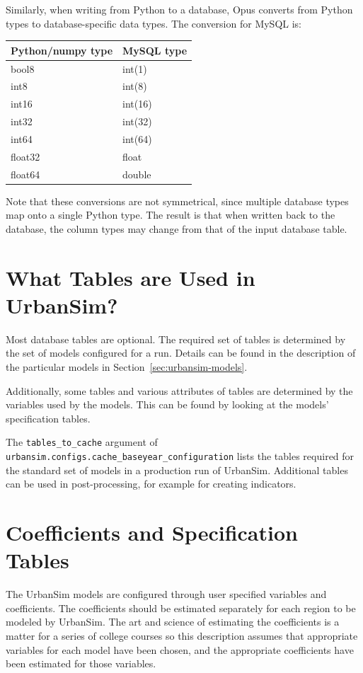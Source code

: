 Similarly, when writing from Python to a database, Opus converts from Python
types to database-specific data types.  The conversion for MySQL is:

\begin{tabular}{ll}
Python/numpy type & MySQL type \\
\hline
bool8 & int(1) \\
int8 & int(8) \\
int16 & int(16) \\
int32 & int(32) \\
int64 & int(64) \\
float32 & float \\
float64 & double \\
\end{tabular}

Note that these conversions are not symmetrical, since multiple
database types map onto a single Python type.  The result is that
when written back to the database, the column types may change from
that of the input database table.

\section{What Tables are Used in UrbanSim?}
%
Most database tables are optional. The required set of tables is determined by the set of models configured for
a run. Details can be found in the description of the particular models in Section~\ref{sec:urbansim-models}. 

Additionally, some tables and various attributes of tables are determined by 
the variables used by the models.  This can be found by looking at the models'
specification tables.

The \verb|tables_to_cache| argument of
\verb|urbansim.configs.cache_baseyear_configuration| lists the tables required for the standard set of models 
in a production run of UrbanSim. Additional tables can be used in post-processing, for example for creating
indicators.


\section{Coefficients and Specification Tables}

The UrbanSim models are configured through user specified
variables and coefficients. The coefficients should be
estimated separately for each region to be modeled by UrbanSim. The art and
science of estimating the coefficients is a matter for a series of college
courses so this description assumes that appropriate variables for each model
have been chosen, and the appropriate coefficients have been estimated for
those variables.

